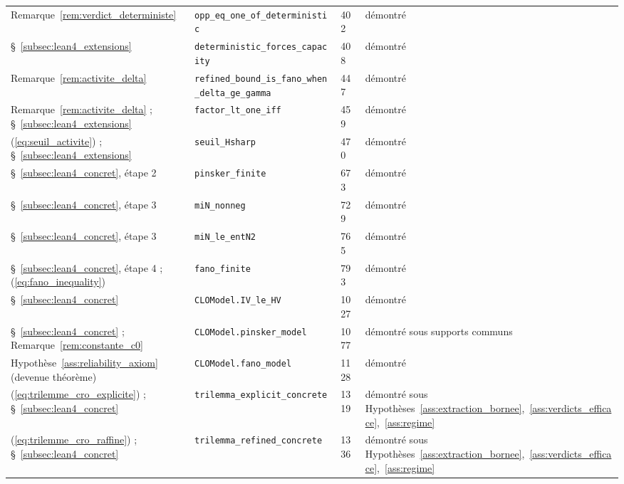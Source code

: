 {\begin{longtable}{@{}p{4.6cm}p{5.2cm}p{0.9cm}>{\raggedright\arraybackslash}p{3.6cm}@{}}
Remarque~\ref{rem:verdict_deterministe} & \texttt{opp\_\allowbreak{}eq\_\allowbreak{}one\_\allowbreak{}of\_\allowbreak{}deterministic} & 402 & démontré \\
§~\ref{subsec:lean4_extensions} & \texttt{deterministic\_\allowbreak{}forces\_\allowbreak{}capacity} & 408 & démontré \\
Remarque~\ref{rem:activite_delta} & \texttt{refined\_\allowbreak{}bound\_\allowbreak{}is\_\allowbreak{}fano\_\allowbreak{}when\_\allowbreak{}delta\_\allowbreak{}ge\_\allowbreak{}gamma} & 447 & démontré \\
Remarque~\ref{rem:activite_delta} ; §~\ref{subsec:lean4_extensions} & \texttt{factor\_\allowbreak{}lt\_\allowbreak{}one\_\allowbreak{}iff} & 459 & démontré \\
(\ref{eq:seuil_activite}) ; §~\ref{subsec:lean4_extensions} & \texttt{seuil\_\allowbreak{}Hsharp} & 470 & démontré \\
§~\ref{subsec:lean4_concret}, étape 2 & \texttt{pinsker\_\allowbreak{}finite} & 673 & démontré \\
§~\ref{subsec:lean4_concret}, étape 3 & \texttt{miN\_\allowbreak{}nonneg} & 729 & démontré \\
§~\ref{subsec:lean4_concret}, étape 3 & \texttt{miN\_\allowbreak{}le\_\allowbreak{}entN2} & 765 & démontré \\
§~\ref{subsec:lean4_concret}, étape 4 ; (\ref{eq:fano_inequality}) & \texttt{fano\_\allowbreak{}finite} & 793 & démontré \\
§~\ref{subsec:lean4_concret} & \texttt{CLOModel.IV\_\allowbreak{}le\_\allowbreak{}HV} & 1027 & démontré \\
§~\ref{subsec:lean4_concret} ; Remarque~\ref{rem:constante_c0} & \texttt{CLOModel.pinsker\_\allowbreak{}model} & 1077 & démontré sous supports communs \\
Hypothèse~\ref{ass:reliability_axiom} (devenue théorème) & \texttt{CLOModel.fano\_\allowbreak{}model} & 1128 & démontré \\
(\ref{eq:trilemme_cro_explicite}) ; §~\ref{subsec:lean4_concret} & \texttt{trilemma\_\allowbreak{}explicit\_\allowbreak{}concrete} & 1319 & démontré sous Hypothèses~\ref{ass:extraction_bornee},~\ref{ass:verdicts_efficace},~\ref{ass:regime} \\
(\ref{eq:trilemme_cro_raffine}) ; §~\ref{subsec:lean4_concret} & \texttt{trilemma\_\allowbreak{}refined\_\allowbreak{}concrete} & 1336 & démontré sous Hypothèses~\ref{ass:extraction_bornee},~\ref{ass:verdicts_efficace},~\ref{ass:regime} \\

\end{longtable}}
